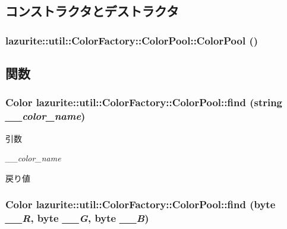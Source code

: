 \subsection{コンストラクタとデストラクタ}
\hypertarget{classlazurite_1_1util_1_1_color_factory_1_1_color_pool_a3c8dcf68b1ba944832f21347a25e2b92}{
\subsubsection[{ColorPool}]{\setlength{\rightskip}{0pt plus 5cm}lazurite::util::ColorFactory::ColorPool::ColorPool ()}}
\label{classlazurite_1_1util_1_1_color_factory_1_1_color_pool_a3c8dcf68b1ba944832f21347a25e2b92}


\subsection{関数}
\hypertarget{classlazurite_1_1util_1_1_color_factory_1_1_color_pool_a5d29ef5dd3643fbdcfff66310a22d775}{
\subsubsection[{find}]{\setlength{\rightskip}{0pt plus 5cm}Color lazurite::util::ColorFactory::ColorPool::find (string {\em \_\-\_\-color\_\-name})}}
\label{classlazurite_1_1util_1_1_color_factory_1_1_color_pool_a5d29ef5dd3643fbdcfff66310a22d775}

\begin{DoxyParams}{引数}
\item[{\em \_\-\_\-color\_\-name}]\end{DoxyParams}
\begin{DoxyReturn}{戻り値}

\end{DoxyReturn}
\hypertarget{classlazurite_1_1util_1_1_color_factory_1_1_color_pool_ac163ca2ed2b175b96227b93b93790c0e}{
\subsubsection[{find}]{\setlength{\rightskip}{0pt plus 5cm}Color lazurite::util::ColorFactory::ColorPool::find (byte {\em \_\-\_\-R}, \/  byte {\em \_\-\_\-G}, \/  byte {\em \_\-\_\-B})}}
\label{classlazurite_1_1util_1_1_color_factory_1_1_color_pool_ac163ca2ed2b175b96227b93b93790c0e}

